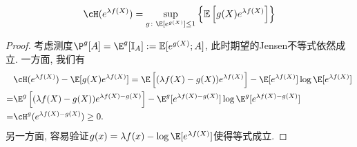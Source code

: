 \begin{theorem}[熵的变分表示]\label{thm:VariationalRepresentationForEntropy}
	\begin{equation}\label{eq:VariationalRepresentationForEntropy}
		\cH(e^{\lambda f(X)})
		= \sup_{g \colon \E [e^{g(X)}] \leq 1} \left\{ \mathbb{E} \left[g(X) e^{\lambda f(X)} \right] \right\}
	\end{equation}
\end{theorem}
\begin{proof}
	考虑测度$\P^g[A] = \E^g [\mathbb{I}_A] := \mathbb{E}[e^{g(X)}; A]$, 此时期望的Jensen不等式依然成立. 
	一方面, 我们有
	\begin{align*}
		&\cH(e^{\lambda f(X)}) - \E[g(X) e^{\lambda f(X)}]
		= \E \left[ (\lambda f(X) - g(X)) e^{\lambda f(X)} \right] - \E[ e^{\lambda f(X)}] \log \E[ e^{\lambda f(X)}] \\
		=& \E^g  \left[ (\lambda f(X) - g(X)) e^{\lambda f(X) - g(X)} \right] - \E^g[ e^{\lambda f(X) - g(X)}] \log \E^g[ e^{\lambda f(X) - g(X)}] \\
		=& \cH^g(e^{\lambda f(X) - g(X)}) \geq 0. 
	\end{align*}
	另一方面, 容易验证$g(x) = \lambda f(x) - \log \E[e^{\lambda f(X)}]$使得等式成立. 
\end{proof}

